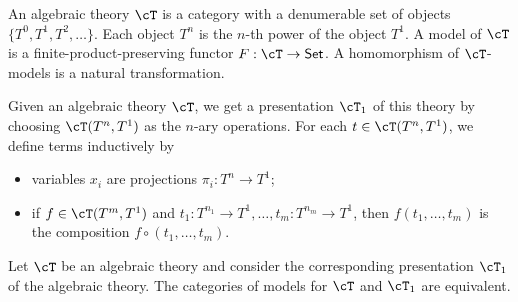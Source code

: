 \documentclass{amsart}
\begin{document}
\begin{defn}
  An algebraic theory $\cT$ is a category with a denumerable set of objects $\{T^{0}, T^{1}, T^{2}, \ldots\}$.
  Each object $T^{n}$ is the $n$-th power of the object $T^{1}$.
  A model of $\cT$ is a finite-product-preserving functor $F : \cT \to \mathsf{Set}$.
  A homomorphism of $\cT$-models is a natural transformation.
\end{defn}

Given an algebraic theory $\cT$, we get a presentation $\cT_{1}$ of this theory by choosing $\cT(T^{n}, T^{1})$ as the $n$-ary operations.
For each $t \in \cT(T^{n}, T^{1})$, we define terms inductively by
\begin{itemize}
\item variables $x_{i}$ are projections $\pi_{i} : T^{n} \to T^{1}$;
\item if $f \in \cT(T^{m},T^{1})$ and $t_{1} : T^{n_{1}} \to T^{1},\ldots,t_{m} : T^{n_{m}} \to T^{1}$, then $f(t_{1},\ldots,t_{m})$ is the composition $f \circ (t_{1},\ldots,t_{m})$.
\end{itemize}

\begin{lem}
  Let $\cT$ be an algebraic theory and consider the corresponding presentation $\cT_{1}$ of the algebraic theory.
  The categories of models for $\cT$ and $\cT_{1}$ are equivalent.
\end{lem}



\end{document}

